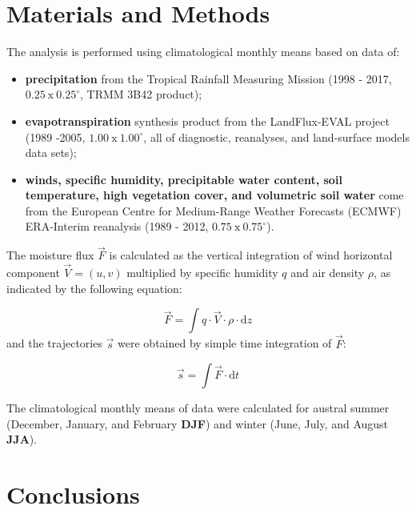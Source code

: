 \documentclass[a0, portrait]{a0poster}
\begin{document}
\begin{multicols}{2}
\section*{\centering Materials and Methods}

The analysis is performed using climatological monthly means based on data of:

\begin{itemize}
\item \textbf{precipitation} from the Tropical Rainfall Measuring Mission (1998 - 2017,
$0.25 \: \text{x} \: 0.25^{\circ}$, TRMM 3B42 product);
\item \textbf{evapotranspiration} synthesis product from the LandFlux-EVAL
project (1989 -2005, $1.00 \: \text{x} \: 1.00^{\circ}$, all of diagnostic,
reanalyses, and land-surface models data sets);
\item \textbf{winds, specific humidity, precipitable water content, soil
temperature, high vegetation cover, and volumetric soil water} come from the European Centre for
Medium-Range Weather Forecasts (ECMWF) ERA-Interim reanalysis (1989 - 2012,
$0.75 \: \text{x} \:0.75^{\circ}$).
\end{itemize}

\vspace{0.5cm}

The moisture flux $\vec{F}$ is calculated as the vertical integration of wind
horizontal component $\vec{V} = (u, v)$ multiplied by specific humidity $q$
and air density $\rho$, as indicated by the following equation:

\begin{equation}
\vec{F} = \int q \cdot \vec{V} \cdot \rho \cdot \text{d}z
\end{equation}
and the trajectories $\vec{s}$ were obtained by simple time integration of
$\vec{F}$:

\begin{equation}
\vec{s} = \int \vec{F} \cdot \text{d}t
\end{equation}

\vspace{0.5cm}

The climatological monthly means of data were calculated for austral summer
(December, January, and February \textbf{DJF}) and winter (June, July, and
August \textbf{JJA}).

\section*{\centering Conclusions}


\end{multicols}
\end{document}

